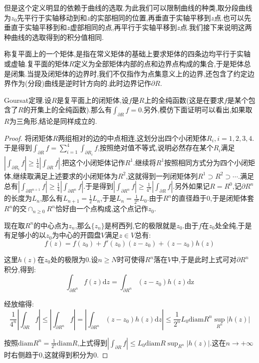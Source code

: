 但是这个定义明显的依赖于曲线的选取.为此我们可以限制曲线的种类,取分段曲线为$z_0$先平行于实轴移动到和$z$的实部相同的位置,再垂直于实轴平移到$z$点.也可以先垂直于实轴平移到和$z$虚部相同的点,再平行于实轴平移到$z$点.我们接下来说明这两种曲线的选取得到的积分值相同.

称复平面上的一个矩体,是指在常义矩体的基础上要求矩体的四条边均平行于实轴或虚轴.复平面的矩体$R$定义为全部矩体内部的点和边界点构成的集合,于是矩体总是闭集.当提及闭矩体的边界时,我们不仅指作为点集意义上的边界,还包含了约定边界作为(分段)曲线是逆时针方向的.此时边界记作$\partial R$.

Goursat定理.设$R$是复平面上的闭矩体,设$f$是$R$上的全纯函数(这是在要求$f$是某个包含了$R$的开集上的全纯函数).那么有$\int_{\partial R}f=0$.另外,模仿下面证明可以看出,如果取$R$为三角形,结论是同样成立的.
\begin{proof}
	
	将闭矩体$R$两组相对的边的中点相连,这划分出四个小闭矩体$R_i,i=1,2,3,4$.于是得到$\int_{\partial R}f=\sum_{i=1}^4\int_{\partial R_i}f$,按照绝对值不等式,说明必然存在某个$R_i$满足$\left|\int_{\partial R_i}f\right|\ge\frac{1}{4}\left|\int_{\partial R}f\right|$.把这个小闭矩体记作$R^1$.继续将$R^1$按照相同方式分为四个小闭矩体,继续取满足上述要求的小闭矩体为$R^2$,这就得到一列闭矩体列$R^1\supset R^2\supset\cdots$.满足总有$\left|\int_{\partial R^{n+1}}f\right|\ge\frac{1}{4}\left|\int_{\partial R^n}f\right|$.于是得到$\left|\int_{\partial R^n}f\right|\ge\frac{1}{4^n}\left|\int_{\partial R}f\right|$.另外如果记$R=R^0$,记$\partial R^n$的长度为$L_n$,那么有$L_{n+1}=\frac{1}{2}L_n$,于是$L_n=\frac{1}{2^n}L_0$.由于$R^n$的直径趋于0,于是闭矩体套$R^n$的交$\cap_{n\ge0}R^n$恰好由一个点构成,这个点记作$z_0$.
	
	现在取$R^n$的中心点为$z_n$,那么$\{z_n\}$是柯西列,它的极限就是$z_0$.由于$f$在$z_0$处全纯,于是有足够小的以$z_0$为中心的开圆盘$V$满足$z\in V$总有:
	$$f(z)=f(z_0)+f'(z_0)(z-z_0)+(z-z_0)h(z)$$
	
	这里$h(z)$在$z_0$处的极限为0.设$n\ge N$时可使得$R^n$落在$V$中,于是此时上式可对$\partial R^n$积分,得到:
	$$\int_{\partial R^n}f(z)\mathrm{d}z=\int_{\partial R^n}(z-z_0)h(z)\mathrm{dz}$$
	
	经放缩得:$$\frac{1}{4^n}\left|\int_{\partial R}f\right|\le\left|\int_{\partial R^n}f\right|=\left|\int_{\partial R^n}(z-z_0)h(z)\mathrm{d}z\right|\le\frac{1}{2^n}L_0\mathrm{diam} R^n\sup_{R^n}|h(z)|$$
	
	按照$\mathrm{diam} R^n=\frac{1}{2^n}\mathrm{diam} R$,上式得到$\left|\int_{\partial R}f\right|\le L_0\mathrm{diam}R\sup_{R^n}|h(z)|$.这在$n\to+\infty$时右侧趋于0,这就得到积分为0.
\end{proof}

